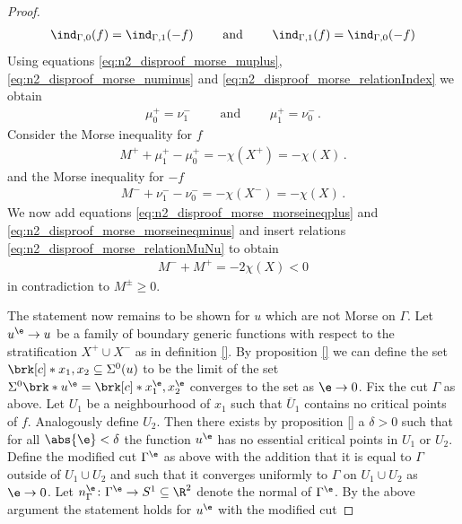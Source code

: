 \begin{proof}
\begin{align}
    \ind_{\Gamma,0}(f)=\ind_{\Gamma,1}(-f)\qquad\text{ and }\qquad 
    \ind_{\Gamma,1}(f)=\ind_{\Gamma,0}(-f)\label{eq:n2_disproof_morse_relationIndex} 
  \end{align}
  Using equations \eqref{eq:n2_disproof_morse_muplus}, \eqref{eq:n2_disproof_morse_numinus} and \eqref{eq:n2_disproof_morse_relationIndex}
  we obtain
  \begin{align}
    \mu^+_0=\nu^-_1 \qquad\text{ and }\qquad \mu^+_1=\nu^-_0\,.\label{eq:n2_disproof_morse_relationMuNu}
  \end{align}
  Consider the Morse inequality for $f$
  \begin{align}
    M^++\mu^+_1-\mu^+_0=-\chi(X^+)=-\chi(X)\,.\label{eq:n2_disproof_morse_morseineqplus}
  \end{align}
  and the Morse inequality for $-f$
  \begin{align}
    M^-+\nu^-_1-\nu^-_0=-\chi(X^-)=-\chi(X)\,.\label{eq:n2_disproof_morse_morseineqminus}
  \end{align}
  We now add equations \eqref{eq:n2_disproof_morse_morseineqplus} and \eqref{eq:n2_disproof_morse_morseineqminus}
  and insert relations \eqref{eq:n2_disproof_morse_relationMuNu} to obtain
  \begin{align*}
    M^-+M^+=-2\chi(X)<0
  \end{align*}
  in contradiction to $M^\pm\geq0$.

  The statement now remains to be shown for $u$ which are not Morse on $\Gamma$.
  Let $u^\e\to u$ be a family of boundary generic functions with respect to the 
  stratification $X^+\cup X^-$ as in definition \ref{}.
  By proposition \ref{} we can define the set $\brk[c]*{x_1,x_2}\subseteq\Sigma^0(u)$
  to be the limit of the set $\Sigma^0\brk*{u^\e}=\brk[c]*{x_1^\e,x_2^\e}$ converges to the set
  as $\e\to0$.
  Fix the cut $\Gamma$ as above.
  Let $U_1$ be a neighbourhood of $x_1$ such that $\overline{U}_1$ contains no critical points of $f$.
  Analogously define $U_2$.
  Then there exists by proposition \ref{} a $\delta>0$ such that for all 
  $\abs{\e}<\delta$ the function $u^\e$ has no essential critical points in $U_1$
  or $U_2$.
  Define the modified cut $\Gamma^\e$ as above with the addition that it is equal to $\Gamma$ outside of $U_1\cup U_2$ and such that it
  converges uniformly to $\Gamma$ on $U_1\cup U_2$ as $\e\to0$.
  Let $n_\Gamma^\e\colon\Gamma^\e\to S^1\subseteq\R^2$ denote the
  normal of $\Gamma^\e$.
  By the above argument the statement holds for $u^\e$ with the modified cut
\end{proof}
